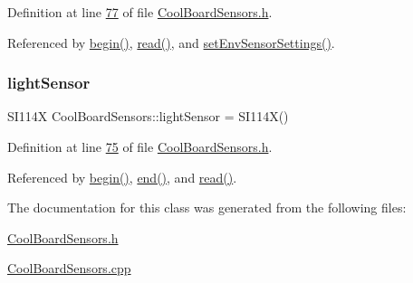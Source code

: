 Definition at line \hyperlink{_cool_board_sensors_8h_source_l00077}{77} of file \hyperlink{_cool_board_sensors_8h_source}{Cool\+Board\+Sensors.\+h}.



Referenced by \hyperlink{_cool_board_sensors_8cpp_source_l00085}{begin()}, \hyperlink{_cool_board_sensors_8cpp_source_l00123}{read()}, and \hyperlink{_cool_board_sensors_8cpp_source_l00391}{set\+Env\+Sensor\+Settings()}.

\mbox{\label{class_cool_board_sensors_a3e397300fb707dd193e909a757bf6102}} 
\subsubsection{\texorpdfstring{light\+Sensor}{lightSensor}}
{\footnotesize\ttfamily S\+I114X Cool\+Board\+Sensors\+::light\+Sensor = S\+I114X()}



Definition at line \hyperlink{_cool_board_sensors_8h_source_l00075}{75} of file \hyperlink{_cool_board_sensors_8h_source}{Cool\+Board\+Sensors.\+h}.



Referenced by \hyperlink{_cool_board_sensors_8cpp_source_l00085}{begin()}, \hyperlink{_cool_board_sensors_8cpp_source_l00108}{end()}, and \hyperlink{_cool_board_sensors_8cpp_source_l00123}{read()}.



The documentation for this class was generated from the following files\+:\begin{DoxyCompactItemize}
\item 
\hyperlink{_cool_board_sensors_8h}{Cool\+Board\+Sensors.\+h}\item 
\hyperlink{_cool_board_sensors_8cpp}{Cool\+Board\+Sensors.\+cpp}\end{DoxyCompactItemize}
